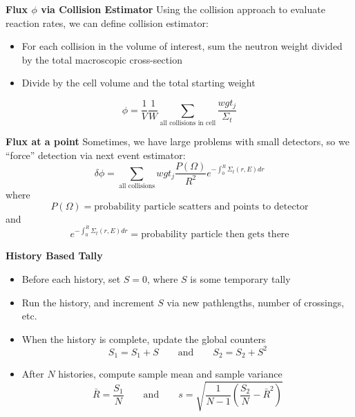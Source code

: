 \textbf{Flux $\phi$ via Collision Estimator}
  Using the collision approach to evaluate reaction rates, we can 
  define \textcolor{mitred}{collision estimator}:
  \begin{itemize}
      \item For each collision in the volume of interest, sum the 
             neutron weight divided by the total macroscopic cross-section
      \item Divide by the cell volume and the total starting weight
  \end{itemize}
   \begin{equation*}
        \phi = \frac{1}{V}\frac{1}{W} 
          \sum_{\text{all collisions in cell}} \frac{wgt_{j}}{\Sigma_{t}}
   \end{equation*}   
   
\textbf{Flux at a point}
   Sometimes, we have large problems with small detectors, so we ``force''
   detection via \textcolor{mitred}{next event estimator}:
   \begin{equation*}
        \delta \phi = \sum_{\text{all collisions}} wgt_{j} 
        \frac{P(\Omega)} {R^{2}} e^{-\int_{0}^{R}{\Sigma_{t}(r,E)dr}}
   \end{equation*}
   where
   \begin{equation*}
     P(\Omega) = \text{probability particle scatters and points to detector}
   \end{equation*}
   and 
   \begin{equation*}
        e^{-\int_{0}^{R}{\Sigma_{t}(r,E)dr}} = \text{probability particle then gets there}
   \end{equation*}
 
\textbf{History Based Tally}
  \begin{itemize}
   \item Before each history, set $S = 0$, where $S$ is some temporary tally
   \item Run the history, and increment $S$ via new pathlengths, number of 
         crossings, etc.
   \item When the history is complete, update the global counters
   \begin {equation*}
     S_{1} = S_{1} + S \quad\quad \text{and} 
       \quad\quad S_{2} = S_{2} + S^{2}
   \end {equation*}
   \item After $N$ histories, compute sample mean and sample variance
   \begin {equation*}
     \bar{R} = \frac{S_{1}}{N} \quad\quad \text{and}  
     \quad\quad 
     s = \sqrt{\frac{1}{N-1}\left(\frac{S_{2}}{N}-\bar{R}^{2}\right)}
   \end {equation*}
  \end{itemize}
  
